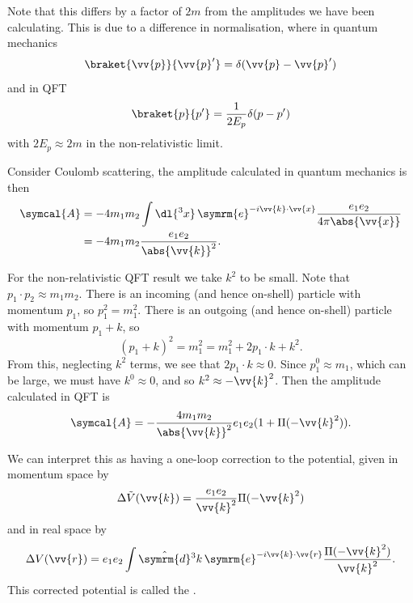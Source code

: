 \documentclass[fleqn]{NotesClass}
\newcommand{\e}{\symrm{e}}
\newcommand{\amplitude}{\symcal{A}}
\newcommand{\dhat}[1]{\hat{\symrm{d}}{#1}}
\begin{document}
    Note that this differs by a factor of \(2m\) from the amplitudes we have been calculating.
    This is due to a difference in normalisation, where in quantum mechanics
    \begin{equation}
        \braket{\vv{p}}{\vv{p}'} = \delta(\vv{p} - \vv{p}')
    \end{equation}
    and in QFT
    \begin{equation}
        \braket{p}{p'} = \frac{1}{2E_p}\delta(p - p')
    \end{equation}
    with \(2E_p \approx 2m\) in the non-relativistic limit.
    
    Consider Coulomb scattering, the amplitude calculated in quantum mechanics is then
    \begin{align}
        \amplitude &= -4m_1m_2 \int \dl{^3x} \, \e^{-i\vv{k} \cdot \vv{x}} \frac{e_1e_2}{4\pi\abs{\vv{x}}}\\
        &= -4m_1m_2\frac{e_1e_2}{\abs{\vv{k}}^2}.
    \end{align}
    
    For the non-relativistic QFT result we take \(k^2\) to be small.
    Note that \(p_1 \cdot p_2 \approx m_1 m_2\).
    There is an incoming (and hence on-shell) particle with momentum \(p_1\), so \(p_1^2 = m_1^2\).
    There is an outgoing (and hence on-shell) particle with momentum \(p_1 + k\), so
    \begin{equation}
        (p_1 + k)^2 = m_1^2 = m_1^2 + 2p_1 \cdot k + k^2.
    \end{equation}
    From this, neglecting \(k^2\) terms, we see that \(2p_1 \cdot k \approx 0\).
    Since \(p_1^0 \approx m_1\), which can be large, we must have \(k^0 \approx 0\), and so \(k^2 \approx -\vv{k}^2\).
    Then the amplitude calculated in QFT is
    \begin{equation}
        \amplitude = -\frac{4m_1m_2}{\abs{\vv{k}}^2} e_1e_2(1 + \Pi(-\vv{k}^2)).
    \end{equation}
    
    We can interpret this as having a one-loop correction to the potential, given in momentum space by
    \begin{equation}
        \Delta\tilde{V}(\vv{k}) = \frac{e_1e_2}{\vv{k}^2}\Pi(-\vv{k}^2)
    \end{equation}
    and in real space by
    \begin{equation}
        \Delta V(\vv{r}) = e_1 e_2 \int \dhat{^3k} \, \e^{-i\vv{k} \cdot \vv{r}} \frac{\Pi(-\vv{k}^2)}{\vv{k}^2}.
    \end{equation}
    This corrected potential is called the .
    
\end{document}
